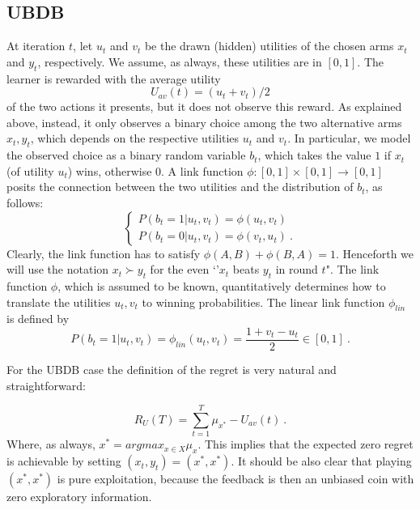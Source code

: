 \documentclass[MSc,beforeExam]{iitcsthesis}
\begin{document}
	\subsection{UBDB}
At iteration $t$, let  $u_t$ and $v_t$ be the drawn (hidden) utilities of the chosen arms $x_t$ and $y_t$,
respectively.
		We assume, as always, these utilities are in $[0, 1]$.
		The learner is rewarded with the average utility $$U_{av}(t) = (u_t + v_t)/2$$ %
of the two actions it presents, but it does not observe this reward. 
		 As explained above, instead, it only observes a binary choice among the two alternative arms $x_t, y_t$, which depends on the respective utilities $u_t$ and $v_t$.
		In particular, we model the observed choice as a binary random variable $b_t$, which takes the
value $1$ if $x_t$ (of utility $u_t$) wins, otherwise $0$.
 A link function $\phi :[0, 1] \times [0, 1] \rightarrow [0, 1]$ posits the
connection between the two utilities and the distribution of $b_t$, as follows:
		\begin{equation}\label{eq:b_t}
		\begin{cases}
		P(b_t = 1|u_t, v_t) = \phi(u_t, v_t)
		\\
		P(b_t = 0|u_t, v_t) = \phi(v_t, u_t)\ .
		\end{cases}
		\end{equation}
	Clearly, the link function has to satisfy $\phi(A, B) + \phi(B, A) = 1$.
	Henceforth we will use the notation $x_t \succ y_t $ for the even `'$x_t$ beats $y_t$ in round $t$".
	The link function $\phi$, which is assumed to be known, quantitatively determines how to translate the utilities $u_t, v_t$ to winning probabilities.
	The linear link function $\phi_{lin}$ is defined by
	\begin{equation}\label{eq:link_function}
		P(b_t = 1|u_t, v_t) = \phi_{lin}(u_t, v_t) = \frac{1+v_t-u_t}{2}\in [0,1]\ .
	\end{equation}

	For the UBDB case the definition of the regret is very natural and straightforward:

	\begin{equation}\label{eq:utility_regret}
		R_U(T) = \sum_{t=1}^T \mu_{x^*}-U_{av}(t)\ .
	\end{equation}
	Where, as always, $x^* = argmax_{x \in X} \mu_{x}$.
	This implies that the expected zero regret is achievable by setting $(x_t, y_t) = (x^*,x^*)$.
	It should be also clear that playing $(x^*,x^*)$ is pure exploitation, because the feedback is then an unbiased coin with zero exploratory information.
	
\end{document}
